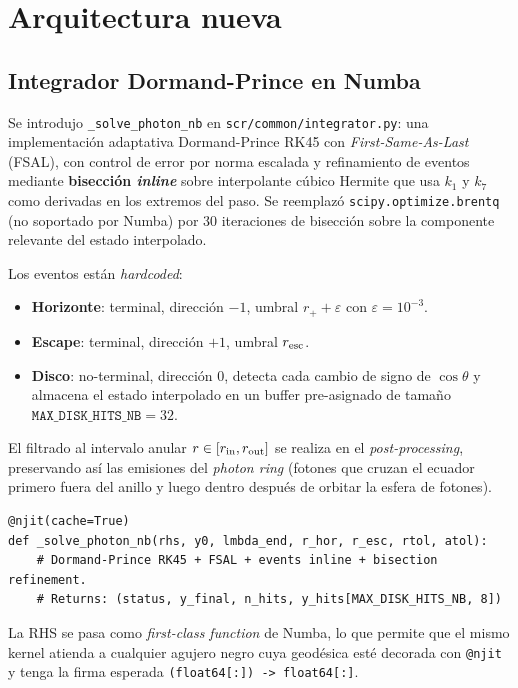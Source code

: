 \documentclass[11pt,a4paper]{article}
\begin{document}
\section{Arquitectura nueva}

\subsection{Integrador Dormand-Prince en Numba}

Se introdujo \texttt{\_solve\_photon\_nb} en
\texttt{scr/common/integrator.py}: una implementación adaptativa
Dormand-Prince RK45 con \emph{First-Same-As-Last} (FSAL), con control
de error por norma escalada y refinamiento de eventos mediante
\textbf{bisección \emph{inline}} sobre interpolante cúbico Hermite que
usa $k_1$ y $k_7$ como derivadas en los extremos del paso. Se
reemplazó \texttt{scipy.optimize.brentq} (no soportado por Numba) por
30 iteraciones de bisección sobre la componente relevante del estado
interpolado.

Los eventos están \emph{hardcoded}:
\begin{itemize}
  \item \textbf{Horizonte}: terminal, dirección $-1$, umbral
        $r_{+} + \varepsilon$ con $\varepsilon = 10^{-3}$.
  \item \textbf{Escape}: terminal, dirección $+1$, umbral $r_{\rm esc}$.
  \item \textbf{Disco}: no-terminal, dirección $0$, detecta cada cambio
        de signo de $\cos\theta$ y almacena el estado interpolado en un
        buffer pre-asignado de tamaño $\texttt{MAX\_DISK\_HITS\_NB} = 32$.
\end{itemize}
El filtrado al intervalo anular $r \in [r_{\rm in}, r_{\rm out}]$ se
realiza en el \emph{post-processing}, preservando así las emisiones del
\emph{photon ring} (fotones que cruzan el ecuador primero fuera del
anillo y luego dentro después de orbitar la esfera de fotones).

\begin{lstlisting}[style=py, caption={Firma del integrador Numba.}]
@njit(cache=True)
def _solve_photon_nb(rhs, y0, lmbda_end, r_hor, r_esc, rtol, atol):
    # Dormand-Prince RK45 + FSAL + events inline + bisection refinement.
    # Returns: (status, y_final, n_hits, y_hits[MAX_DISK_HITS_NB, 8])
\end{lstlisting}

La RHS se pasa como \emph{first-class function} de Numba, lo que permite
que el mismo kernel atienda a cualquier agujero negro cuya geodésica esté
decorada con \texttt{@njit} y tenga la firma esperada
\verb|(float64[:]) -> float64[:]|.
\end{document}
